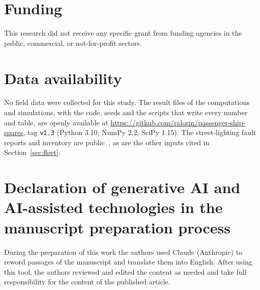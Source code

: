 \documentclass[preprint,12pt]{elsarticle}
\newcommand{\codeTag}{v1.3}
\begin{document}
\section*{Funding}
This research did not receive any specific grant from funding agencies in the
public, commercial, or not-for-profit sectors.

\section*{Data availability}
No field data were collected for this study. The result files of the
computations and simulations, with the code, seeds and the scripts that write
every number and table, are openly available at
\url{https://github.com/ralorin/passenger-ship-spares}, tag \texttt{\codeTag}
(Python 3.10, NumPy 2.2, SciPy 1.15). The street-lighting fault reports and
inventory are public~\cite{dfi_lighting}, as are the other inputs cited in
Section~\ref{sec:fleet}.

\section*{Declaration of generative AI and AI-assisted technologies in the
manuscript preparation process}
During the preparation of this work the authors used Claude (Anthropic) to
reword passages of the manuscript and translate them into English.
After using this tool, the authors reviewed and edited the content as needed
and take full responsibility for the content of the published article.



\end{document}
